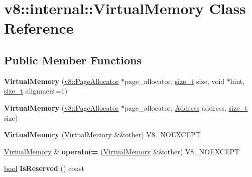 \hypertarget{classv8_1_1internal_1_1VirtualMemory}{}\section{v8\+:\+:internal\+:\+:Virtual\+Memory Class Reference}
\label{classv8_1_1internal_1_1VirtualMemory}
\subsection*{Public Member Functions}
\begin{DoxyCompactItemize}
\item 
\mbox{\label{classv8_1_1internal_1_1VirtualMemory_a3dea48f83d6becf3a8bc7cb88489309f}} 
{\bfseries Virtual\+Memory} (\mbox{\hyperlink{classv8_1_1PageAllocator}{v8\+::\+Page\+Allocator}} $\ast$page\+\_\+allocator, \mbox{\hyperlink{classsize__t}{size\+\_\+t}} size, void $\ast$hint, \mbox{\hyperlink{classsize__t}{size\+\_\+t}} alignment=1)
\item 
\mbox{\label{classv8_1_1internal_1_1VirtualMemory_a58073a6248c11e807ceffc8c56efb4ec}} 
{\bfseries Virtual\+Memory} (\mbox{\hyperlink{classv8_1_1PageAllocator}{v8\+::\+Page\+Allocator}} $\ast$page\+\_\+allocator, \mbox{\hyperlink{classuintptr__t}{Address}} address, \mbox{\hyperlink{classsize__t}{size\+\_\+t}} size)
\item 
\mbox{\label{classv8_1_1internal_1_1VirtualMemory_a406bd7297b3ea0403108e0961aef7d9a}} 
{\bfseries Virtual\+Memory} (\mbox{\hyperlink{classv8_1_1internal_1_1VirtualMemory}{Virtual\+Memory}} \&\&other) V8\+\_\+\+N\+O\+E\+X\+C\+E\+PT
\item 
\mbox{\label{classv8_1_1internal_1_1VirtualMemory_a73af6a92304a1d7123c559aaae416445}} 
\mbox{\hyperlink{classv8_1_1internal_1_1VirtualMemory}{Virtual\+Memory}} \& {\bfseries operator=} (\mbox{\hyperlink{classv8_1_1internal_1_1VirtualMemory}{Virtual\+Memory}} \&\&other) V8\+\_\+\+N\+O\+E\+X\+C\+E\+PT
\item 
\mbox{\label{classv8_1_1internal_1_1VirtualMemory_a4e314fe91c3c610bb8495aa6435cba9f}} 
\mbox{\hyperlink{classbool}{bool}} {\bfseries Is\+Reserved} () const

\end{DoxyCompactItemize}
